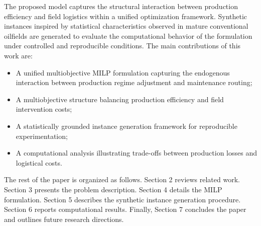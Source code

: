 The proposed model captures the structural interaction between production efficiency and field logistics within a unified optimization framework. Synthetic instances inspired by statistical characteristics observed in mature conventional oilfields are generated to evaluate the computational behavior of the formulation under controlled and reproducible conditions. The main contributions of this work are:
\begin{itemize}
    \item A unified multiobjective MILP formulation capturing the endogenous interaction between production regime adjustment and maintenance routing;
    \item A multiobjective structure balancing production efficiency and field intervention costs;
    \item A statistically grounded instance generation framework for reproducible experimentation;
    \item A computational analysis illustrating trade-offs between production losses and logistical costs.
\end{itemize}


The rest of the paper is organized as follows. Section 2 reviews related work. Section 3 presents the problem description. Section 4 details the MILP formulation. Section 5 describes the synthetic instance generation procedure. Section 6 reports computational results. Finally, Section 7 concludes the paper and outlines future research directions.